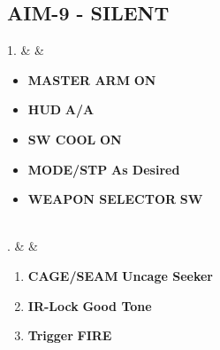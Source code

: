 \documentclass[fontInter]{TechCheck}
\begin{document}
	\subsection{AIM-9 - SILENT}
	\begin{listtabular}
		1. &  &
		\begin{minipage}[t]{\linewidth}
			\vspace{-7pt}
			\begin{itemize}
				\item \textbf{MASTER ARM} \dotfill \textbf{ON}
				\item \textbf{HUD} \dotfill \textbf{A/A}
				\item \textbf{SW COOL} \dotfill \textbf{ON}
				\item \textbf{MODE/STP} \dotfill \textbf{As Desired}
				\item \textbf{WEAPON SELECTOR} \dotfill \textbf{SW}
			\end{itemize}
		\end{minipage} \\
		. &  &
		\begin{minipage}[t]{\linewidth}
			\vspace{-7pt}
			\begin{enumerate}
				\item \textbf{CAGE/SEAM} \dotfill \textbf{Uncage Seeker}
				\item \textbf{IR-Lock} \dotfill \textbf{Good Tone}
				\item \textbf{Trigger} \dotfill \textbf{FIRE}
			\end{enumerate}
		\end{minipage} \\
	\end{listtabular}
\end{document}
